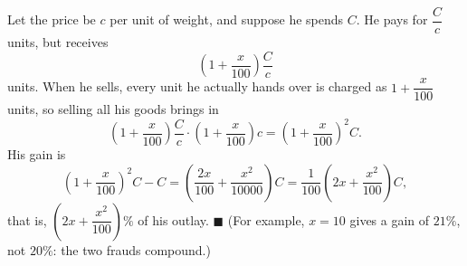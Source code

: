 Let the price be $c$ per unit of weight, and suppose he spends $C$. He pays for $\dfrac Cc$ units, but receives
\[\left(1+\dfrac{x}{100}\right)\dfrac Cc\]
units. When he sells, every unit he actually hands over is charged as $1+\dfrac{x}{100}$ units, so selling all his goods brings in
\[\left(1+\dfrac{x}{100}\right)\dfrac Cc\cdot\left(1+\dfrac{x}{100}\right)c=\left(1+\dfrac{x}{100}\right)^2C.\]
His gain is
\[\left(1+\dfrac{x}{100}\right)^2C-C=\left(\dfrac{2x}{100}+\dfrac{x^2}{10000}\right)C=\dfrac{1}{100}\left(2x+\dfrac{x^2}{100}\right)C,\]
that is, $\left(2x+\dfrac{x^2}{100}\right)\%$ of his outlay. $\blacksquare$ (For example, $x=10$ gives a gain of $21\%$, not $20\%$: the two frauds compound.)
